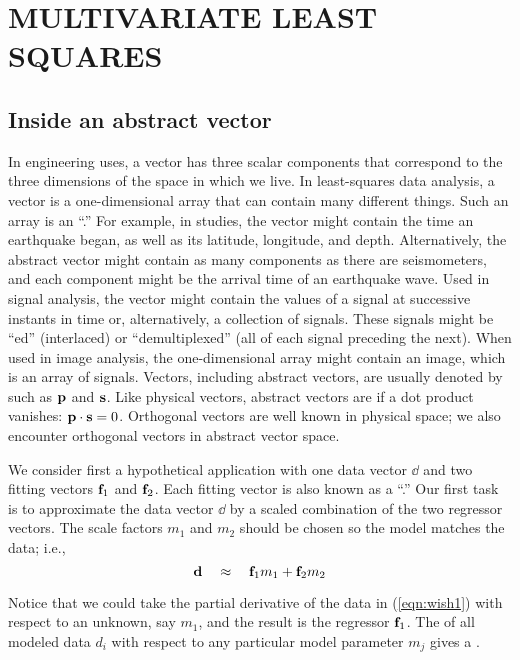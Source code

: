 \section{MULTIVARIATE LEAST SQUARES}

\subsection{Inside an abstract vector}
In engineering uses,
a vector has three scalar components that
correspond to the three dimensions of the space in which we live.
In least-squares data analysis, a vector is a one-dimensional array
that can contain many different things.
Such an array is an ``.''
For example, in  studies,
the vector might contain the time
an earthquake began, as well as its latitude, longitude, and depth.
Alternatively, the abstract vector
might contain as many components as there are seismometers,
and each component might be the arrival time of an earthquake wave.
Used in signal analysis,
the vector might contain the values of a signal
at successive instants in time or,
alternatively, a collection of signals.
These signals might be ``ed'' (interlaced)
or ``demultiplexed'' (all of each signal preceding the next).
When used in image analysis,
the one-dimensional array might contain an image,
which is an array of signals.
Vectors, including abstract vectors,
are usually denoted by  such as $\bold p$ and $\bold s$.
Like physical vectors,
abstract vectors are 
if a dot product vanishes: $\bold p \cdot \bold s =0$.
Orthogonal vectors are well known in physical space;
we also encounter orthogonal vectors in abstract vector space.
\par
We consider first a hypothetical application
with one data vector $\dd$ and two
fitting vectors $\bold f_1$ and $\bold f_2$.
Each fitting vector is also known as a ``.''
Our first task is to approximate the data vector $\dd$
by a scaled combination of the two regressor vectors.
The scale factors $m_1$ and $m_2$
should be chosen so the model matches the data; i.e.,
\begin{equation}
        {\bf d}  \quad \approx \quad \bold f_1 m_1 + \bold f_2 m_2
        \label{eqn:wish1}
\end{equation}
\par
Notice that we could take the partial derivative
of the data in (\ref{eqn:wish1}) with respect to an unknown,
say $m_1$,
and the result is the regressor $\bold f_1$.
The  of all modeled data $d_i$
with respect to any particular model parameter $m_j$
gives a .
\par
{}

